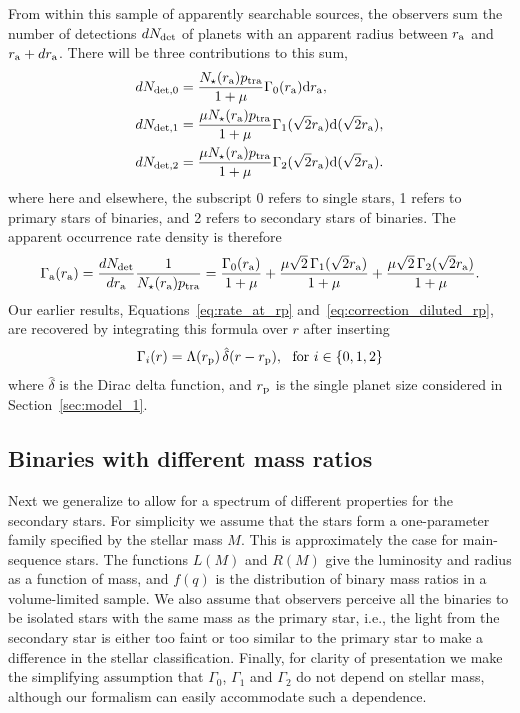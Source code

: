 \documentclass[12pt,modern]{aastex61}
\renewcommand{\a}{_{\rm a}}
\newcommand{\p}{_{\rm p}}
\begin{document}
From within this sample of apparently searchable sources, the
observers sum the number of detections $dN_{\rm det}$ of planets
with an apparent radius between $r\a$ and $r\a + dr\a$.  There will be
three contributions to this sum,
\begin{align}
  dN_{{\rm det},0} &= 
      \frac{N_\star(r\a) p_{\rm tra}}{1+\mu}
      \Gamma_0(r\a)\mathrm{d}r\a,
  \label{eq:n0} \\
  dN_{{\rm det},1} &= 
      \frac{\mu N_\star(r\a) p_{\rm tra}}{1+\mu} 
      \Gamma_1(\sqrt{2}r\a)\mathrm{d}(\sqrt{2}r\a),
	\label{eq:n1} \\
  dN_{{\rm det},2} &=
      \frac{\mu N_\star(r\a) p_{\rm tra}}{1+\mu} 
      \Gamma_2(\sqrt{2}r\a)\mathrm{d}(\sqrt{2}r\a).
	\label{eq:n2}
\end{align}
where here and elsewhere, the subscript 0 refers to single stars, 1
refers to primary stars of binaries, and 2 refers to secondary stars
of binaries. The apparent occurrence rate density is therefore
\begin{equation}
  \Gamma\a(r\a) = \frac{dN_{\rm det}}{dr\a} \frac{1}{N_\star(r\a) p_{\rm tra}} =
  \frac{\Gamma_0(r\a)}{1+\mu} +
  \frac{\mu\sqrt{2}\,\Gamma_1(\sqrt{2}r\a)}{1+\mu} +
  \frac{\mu\sqrt{2}\,\Gamma_2(\sqrt{2}r\a)}{1+\mu}.
	\label{eq:formula_twin_binary}
\end{equation}
Our earlier results, Equations~\ref{eq:rate_at_rp}
and~\ref{eq:correction_diluted_rp}, are recovered by integrating this formula
over $r$ after inserting
\begin{equation}
  \Gamma_i(r) = \Lambda(r\p)\, \hat{\delta}(r-r\p),~~{\rm for}\ i\in\{0,1,2\}
\end{equation}
where $\hat{\delta}$ is the Dirac delta function, and $r\p$ is the
single planet size considered in Section~\ref{sec:model_1}.

\subsection{Binaries with different mass ratios}
\label{sec:general_formula}

Next we generalize to allow for a spectrum of different properties for
the secondary stars.  For simplicity we assume that the stars form a
one-parameter family specified by the stellar mass $M$.  This is
approximately the case for main-sequence stars.  The functions $L(M)$
and $R(M)$ give the luminosity and radius as a function of mass, and
$f(q)$ is the distribution of binary mass ratios in a volume-limited
sample.  We also assume that observers perceive all the binaries to be
isolated stars with the same mass as the primary star, i.e., the light
from the secondary star is either too faint or too similar to the
primary star to make a difference in the stellar classification.
Finally, for clarity of presentation we make the simplifying
assumption that $\Gamma_0$, $\Gamma_1$ and $\Gamma_2$ do not depend on
stellar mass, although our formalism can easily accommodate such a
dependence.
\end{document}
